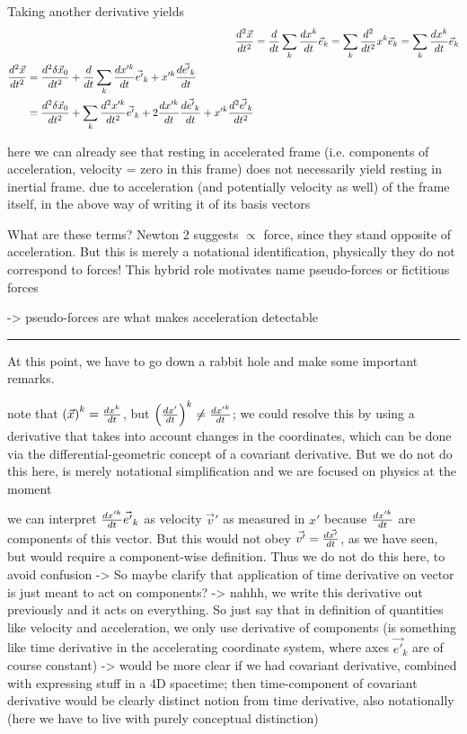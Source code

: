 \documentclass[../class_mech_main.tex]{subfiles}
\begin{document}
Taking another derivative yields
\begin{align}
    \dv[2]{\vec{x}}{t} &= \dv{t} \sum_k \dv{x^k}{t} \vec{e}_k = \sum_k \dv[2]{t} x^k \vec{e}_k = \sum_k \dv{x^k}{t} \vec{e}_k
    \\
	\begin{split}
		\dv[2]{\vec{x}}{t} &= \dv[2]{\delta \vec{x}_0}{t} + \dv{t} \sum_k \dv{x'^k}{t} \vec{e'}_k + x'^k \dv{\vec{e'}_k}{t}
		\\
		&= \dv[2]{\delta \vec{x}_0}{t} + \sum_k \dv[2]{x'^k}{t} \vec{e'}_k + 2 \dv{x'^k}{t} \dv{\vec{e'}_k}{t} + x'^k \dv[2]{\vec{e'}_k}{t}
	\end{split}
    \label{eq:acceleration_accel_frame}
\end{align}

here we can already see that resting in accelerated frame (i.e. components of acceleration, velocity = zero in this frame) does not necessarily yield resting in inertial frame. due to acceleration (and potentially velocity as well) of the frame itself, in the above way of writing it of its basis vectors


What are these terms? Newton 2 suggests $\propto$ force, since they stand opposite of acceleration. But this is merely a notational identification, physically they do not correspond to forces! This hybrid role motivates name pseudo-forces or fictitious forces


-> pseudo-forces are what makes acceleration detectable


\hrule


At this point, we have to go down a rabbit hole and make some important remarks.

note that $\qty(\vec{x})^k = \dv{x^k}{t}$, but $\qty(\dv{x'}{t})^k \neq \dv{x'^k}{t}$; we could resolve this by using a derivative that takes into account changes in the coordinates, which can be done via the differential-geometric concept of a covariant derivative. But we do not do this here, is merely notational simplification and we are focused on physics at the moment


we can interpret $\dv{x'^k}{t} \vec{e'}_k$ as velocity $\vec{v}'$ as measured in $x'$ because $\dv{x'^k}{t}$ are components of this vector. But this would not obey $\vec{v'} = \dv{\vec{x'}}{t}$, as we have seen, but would require a component-wise definition. Thus we do not do this here, to avoid confusion  -> So maybe clarify that application of time derivative on vector is just meant to act on components? -> nahhh, we write this derivative out previously and it acts on everything. So just say that in definition of quantities like velocity and acceleration, we only use derivative of components (is something like time derivative in the accelerating coordinate system, where axes $\vec{e'}_k$ are of course constant) -> would be more clear if we had covariant derivative, combined with expressing stuff in a 4D spacetime; then time-component of covariant derivative would be clearly distinct notion from time derivative, also notationally (here we have to live with purely conceptual distinction)\\
\end{document}
